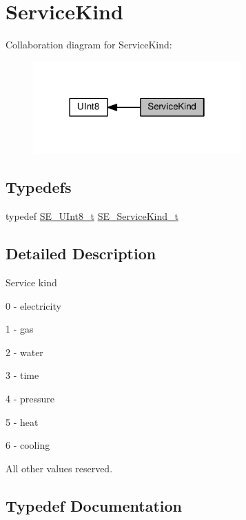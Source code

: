 \hypertarget{group__ServiceKind}{}\section{Service\+Kind}
\label{group__ServiceKind}
Collaboration diagram for Service\+Kind\+:\nopagebreak
\begin{figure}[H]
\begin{center}
\leavevmode
\includegraphics[width=226pt]{group__ServiceKind}
\end{center}
\end{figure}
\subsection*{Typedefs}
\begin{DoxyCompactItemize}
\item 
typedef \hyperlink{group__UInt8_gaf7c365a1acfe204e3a67c16ed44572f5}{S\+E\+\_\+\+U\+Int8\+\_\+t} \hyperlink{group__ServiceKind_ga19a788255c7eeda579474fc6f3cc0810}{S\+E\+\_\+\+Service\+Kind\+\_\+t}
\end{DoxyCompactItemize}


\subsection{Detailed Description}
Service kind

0 -\/ electricity

1 -\/ gas

2 -\/ water

3 -\/ time

4 -\/ pressure

5 -\/ heat

6 -\/ cooling

All other values reserved. 

\subsection{Typedef Documentation}
\mbox{\label{group__ServiceKind_ga19a788255c7eeda579474fc6f3cc0810}} 
